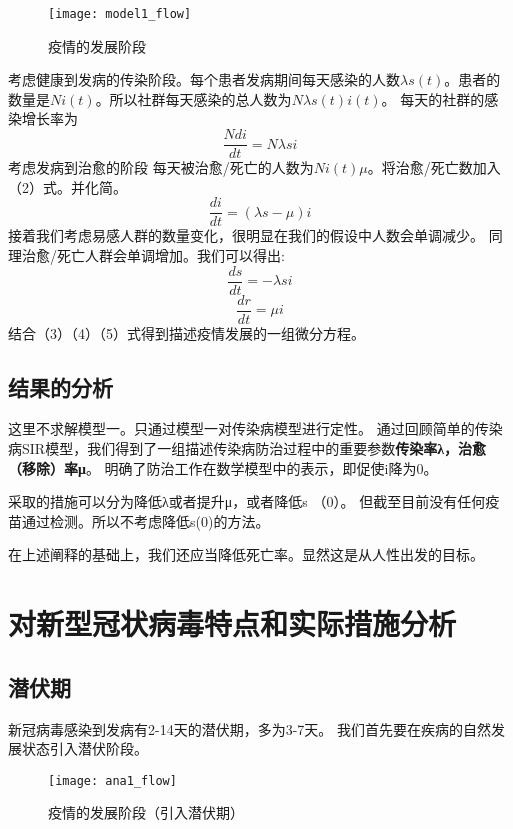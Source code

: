 \documentclass[withoutpreface,bwprint]{cumcmthesis} %
\begin{document}
    \begin{figure}[!h]
        \centering
        \texttt{[image: model1\_flow]}
        \caption{疫情的发展阶段}
        \label{fig:model1_flow}
    \end{figure}
考虑健康到发病的传染阶段。每个患者发病期间每天感染的人数\textit{$\lambda s(t)$}。患者的数量是\textit{$Ni(t)$}。所以社群每天感染的总人数为\textit{$Nλs(t)i(t)$}。
每天的社群的感染增长率为
    \begin{equation}\label{qua:002}
      \frac{Ndi}{dt}=N\lambda si
    \end{equation}
考虑发病到治愈的阶段
每天被治愈/死亡的人数为\textit{$Ni(t)$}$\mu$。将治愈/死亡数加入（2）式。并化简。
    \begin{equation}\label{qua:003}
      \frac{di}{dt}=(\lambda s-\mu )i
    \end{equation}
接着我们考虑易感人群的数量变化，很明显在我们的假设中人数会单调减少。
同理治愈/死亡人群会单调增加。我们可以得出:
    \begin{equation}\label{qua:004}
      \frac{ds}{dt}=-\lambda si
    \end{equation}
    \begin{equation}\label{qua:005}
      \frac{dr}{dt}=\mu i
    \end{equation}
结合（3）（4）（5）式得到描述疫情发展的一组微分方程。
\subsection{结果的分析}
这里不求解模型一。只通过模型一对传染病模型进行定性。
通过回顾简单的传染病SIR模型，我们得到了一组描述传染病防治过程中的重要参数\textbf{传染率λ，治愈（移除）率μ}。
明确了防治工作在数学模型中的表示，即促使i降为0。

采取的措施可以分为降低λ或者提升μ，或者降低s （0）。
但截至目前没有任何疫苗通过检测。所以不考虑降低s(0)的方法。

在上述阐释的基础上，我们还应当降低死亡率。显然这是从人性出发的目标。

\section{对新型冠状病毒特点和实际措施分析}
\subsection{潜伏期}
新冠病毒感染到发病有2-14天的潜伏期，多为3-7天\cite{ref2}。 我们首先要在疾病的自然发展状态引入潜伏阶段。
    \begin{figure}[!h]
        \centering
        \texttt{[image: ana1\_flow]}
        \caption{疫情的发展阶段（引入潜伏期）}
        \label{fig:ana1_flow}
    \end{figure}
\end{document}
